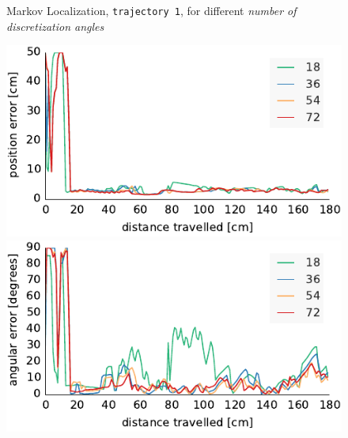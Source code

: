 \documentclass[letterpaper, 10pt, conference]{ieeeconf}
\begin{document}
\begin{figure}

\begin{center}
Markov Localization, \texttt{trajectory~1}, for different \emph{number of discretization angles}
\end{center}
\includegraphics{ml-whole_random_1-xy}\hfill
\includegraphics{ml-whole_random_1-theta}

\vspace{.5em}


\end{figure}
\end{document}
